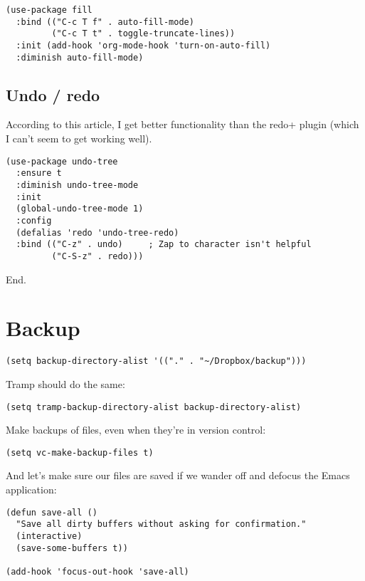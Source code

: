 \documentclass[12pt]{article}
\begin{document}
\lstset{language=Lisp,label= ,caption= ,captionpos=b,numbers=none}
\begin{lstlisting}
(use-package fill
  :bind (("C-c T f" . auto-fill-mode)
         ("C-c T t" . toggle-truncate-lines))
  :init (add-hook 'org-mode-hook 'turn-on-auto-fill)
  :diminish auto-fill-mode)
\end{lstlisting}

\subsection{Undo / redo}
\label{sec:orgb28b276}
According to this article, I get better functionality than the redo+ plugin (which I can’t seem to get working well).
\lstset{language=Lisp,label= ,caption= ,captionpos=b,numbers=none}
\begin{lstlisting}
(use-package undo-tree
  :ensure t
  :diminish undo-tree-mode
  :init
  (global-undo-tree-mode 1)
  :config
  (defalias 'redo 'undo-tree-redo)
  :bind (("C-z" . undo)     ; Zap to character isn't helpful
         ("C-S-z" . redo)))

\end{lstlisting}

End. 

\section{Backup}
\label{sec:orga0ee6ba}

\lstset{language=Lisp,label= ,caption= ,captionpos=b,numbers=none}
\begin{lstlisting}
(setq backup-directory-alist '(("." . "~/Dropbox/backup"))) 
\end{lstlisting}

Tramp should do the same:
\lstset{language=Lisp,label= ,caption= ,captionpos=b,numbers=none}
\begin{lstlisting}
(setq tramp-backup-directory-alist backup-directory-alist)
\end{lstlisting}
Make backups of files, even when they’re in version control:
\lstset{language=Lisp,label= ,caption= ,captionpos=b,numbers=none}
\begin{lstlisting}
(setq vc-make-backup-files t)
\end{lstlisting}
And let’s make sure our files are saved if we wander off and defocus the Emacs application:
\lstset{language=Lisp,label= ,caption= ,captionpos=b,numbers=none}
\begin{lstlisting}
(defun save-all ()
  "Save all dirty buffers without asking for confirmation."
  (interactive)
  (save-some-buffers t))

(add-hook 'focus-out-hook 'save-all)
\end{lstlisting}
\end{document}

